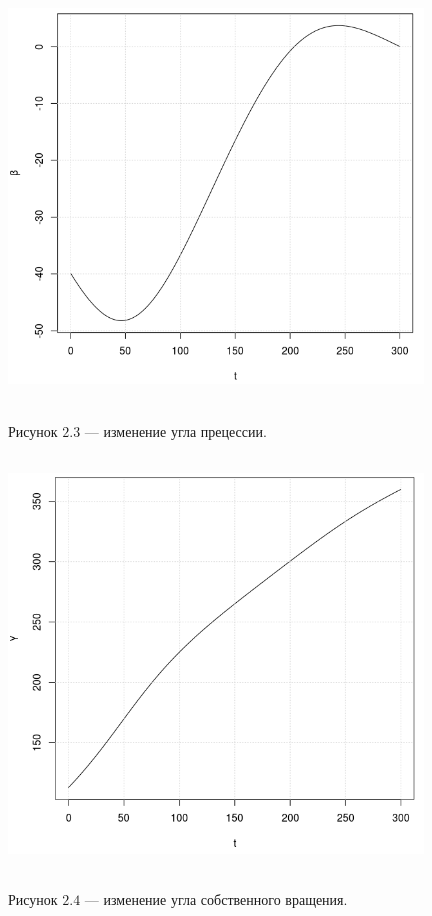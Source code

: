 \documentclass[14pt]{extreport}
\begin{document}
\begin{center}
\includegraphics[width=11cm, height=11cm]{beta.png}

Рисунок $2.3$  --- изменение угла прецессии. 
\end{center}

\begin{center}
\includegraphics[width=11cm, height=11cm]{gamma.png}

Рисунок $2.4$  --- изменение угла собственного вращения. 
\end{center}
\end{document}
